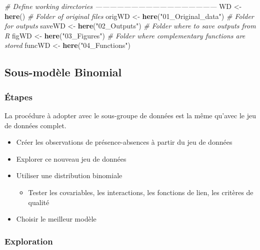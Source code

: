 \documentclass[french,a4paper]{article}
\newenvironment{Shaded}{\begin{snugshade}}{\end{snugshade}}
\newcommand{\KeywordTok}[1]{\textcolor[rgb]{0.13,0.29,0.53}{\textbf{#1}}}
\newcommand{\StringTok}[1]{\textcolor[rgb]{0.31,0.60,0.02}{#1}}
\newcommand{\CommentTok}[1]{\textcolor[rgb]{0.56,0.35,0.01}{\textit{#1}}}
\newcommand{\NormalTok}[1]{#1}
\providecommand{\tightlist}{%
  \setlength{\itemsep}{0pt}\setlength{\parskip}{0pt}}
\begin{document}
\begin{Shaded}
\begin{Highlighting}[]
\CommentTok{# Define working directories ---------------------------------------------------}
\NormalTok{WD <-}\StringTok{ }\KeywordTok{here}\NormalTok{()}
\CommentTok{# Folder of original files}
\NormalTok{origWD <-}\StringTok{ }\KeywordTok{here}\NormalTok{(}\StringTok{"01_Original_data"}\NormalTok{)}
\CommentTok{# Folder for outputs}
\NormalTok{saveWD <-}\StringTok{ }\KeywordTok{here}\NormalTok{(}\StringTok{"02_Outputs"}\NormalTok{)}
\CommentTok{# Folder where to save outputs from R}
\NormalTok{figWD <-}\StringTok{ }\KeywordTok{here}\NormalTok{(}\StringTok{"03_Figures"}\NormalTok{)}
\CommentTok{# Folder where complementary functions are stored}
\NormalTok{funcWD <-}\StringTok{ }\KeywordTok{here}\NormalTok{(}\StringTok{"04_Functions"}\NormalTok{)}
\end{Highlighting}
\end{Shaded}

\subsection{Sous-modèle Binomial}\label{sous-modele-binomial}

\subsubsection{Étapes}\label{etapes}

La procédure à adopter avec le sous-groupe de données est la même
qu'avec le jeu de données complet.

\begin{itemize}
\tightlist
\item
  Créer les observations de présence-absences à partir du jeu de données
\item
  Explorer ce nouveau jeu de données
\item
  Utiliser une distribution binomiale

  \begin{itemize}
  \tightlist
  \item
    Tester les covariables, les interactions, les fonctions de lien, les
    critères de qualité
  \end{itemize}
\item
  Choisir le meilleur modèle
\end{itemize}

\subsubsection{Exploration}\label{exploration}
\end{document}
